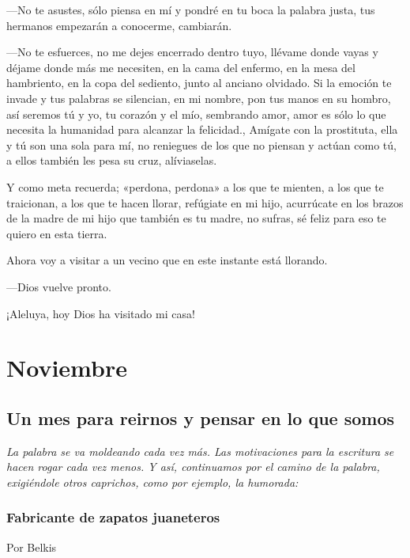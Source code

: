\documentclass[11pt,twoside,openright,a5paper]{book}
\begin{document}
---No te asustes, sólo piensa en mí y pondré en tu boca la palabra justa, tus hermanos empezarán a conocerme, cambiarán.

---No te esfuerces, no me dejes encerrado dentro tuyo, llévame donde vayas y déjame donde más me necesiten, en la cama del enfermo, en la mesa del hambriento, en la copa del sediento, junto al anciano olvidado. Si la emoción te invade y tus palabras se silencian, en mi nombre, pon  tus manos en su hombro, así seremos tú y yo, tu corazón y el mío, sembrando amor, amor es sólo lo que necesita la humanidad para alcanzar la felicidad., Amígate con la prostituta, ella y tú son una sola para mí, no reniegues de los que no piensan y actúan como tú, a ellos también les pesa su cruz, alíviaselas.

Y como meta recuerda; «perdona, perdona» a los  que te mienten, a los que te traicionan, a los que te hacen llorar, refúgiate en mi hijo, acurrúcate en los brazos de la madre de mi hijo que también es tu madre, no sufras, sé feliz para eso te quiero en esta tierra.

Ahora voy a visitar a un vecino que en este instante está llorando.

---Dios vuelve pronto.

¡Aleluya, hoy Dios ha visitado mi casa!

\part*{Noviembre}

\chapter*{Un mes para reirnos y pensar en lo que somos}

\vspace{0.5cm}
\emph{La palabra se va moldeando cada vez más. Las motivaciones para la escritura se hacen rogar cada vez menos. Y así, continuamos por el camino de la palabra, exigiéndole otros caprichos, como por ejemplo, la humorada:}

\section*{Fabricante de zapatos juaneteros}

                                                             \begin{flushright}Por Belkis\end{flushright}
\end{document}
